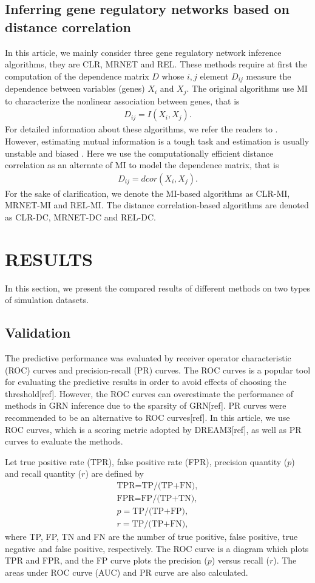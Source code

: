 \documentclass{bioinfo}
\begin{document}
\subsection{Inferring gene regulatory networks based on distance correlation}
In this article, we mainly consider three gene regulatory network inference algorithms, they are CLR, MRNET and REL.
These methods require at first the computation of the dependence matrix $D$ whose $i,j$ element
$D_{ij}$ measure the dependence between variables (genes) $X_i$ and
$X_j$. The original algorithms use MI to characterize the nonlinear
association between genes, that is
\begin{align*}
D_{ij}=I(X_i,X_j).
\end{align*}
For detailed information about these algorithms, we refer the
readers to \citep{faith2007large,meyer2008minet,butte2000mutual}. However, estimating mutual information
is a tough task and estimation is usually unstable and biased \citep{meyer2008minet, de2012bagging}. Here we use the computationally efficient distance correlation as an alternate of MI to
model the dependence matrix, that is
\begin{align*}
D_{ij}=dcor(X_i,X_j).
\end{align*}
For the sake of clarification, we denote the MI-based algorithms as
CLR-MI, MRNET-MI and REL-MI. The distance correlation-based
algorithms are denoted as CLR-DC, MRNET-DC and REL-DC.


\section{RESULTS}
In this section, we present the compared results of different methods on two types of simulation datasets.
\subsection{Validation}
The predictive performance was evaluated by receiver operator
characteristic (ROC) curves and precision-recall (PR) curves. The
ROC curves is a popular tool for evaluating the predictive results
in order to avoid effects of choosing the threshold[ref].  However,
the ROC curves can overestimate the performance of methods in GRN
inference due to the sparsity of GRN[ref]. PR curves were
recommended to be an alternative to ROC curves[ref].  In this
article, we use ROC curves, which is a scoring metric adopted by
DREAM3[ref], as well as PR curves to evaluate the methods.

Let true positive rate (TPR), false positive rate (FPR), precision quantity ($p$) and recall quantity ($r$) are defined by
\begin{align*}
    \mbox{TPR=TP/(TP+FN}),\\
    \mbox{FPR=FP/(TP+TN)},\\
    p=\mbox{TP/(TP+FP)},\\
    r=\mbox{TP/(TP+FN)},
\end{align*}
where TP, FP, TN and FN are the number of true positive, false
positive, true negative and false positive, respectively. The ROC
curve is a diagram which plots TPR and FPR, and the FP curve plots
the precision ($p$)  versus recall ($r$). The areas under ROC curve
(AUC) and PR curve are also calculated.
\end{document}

